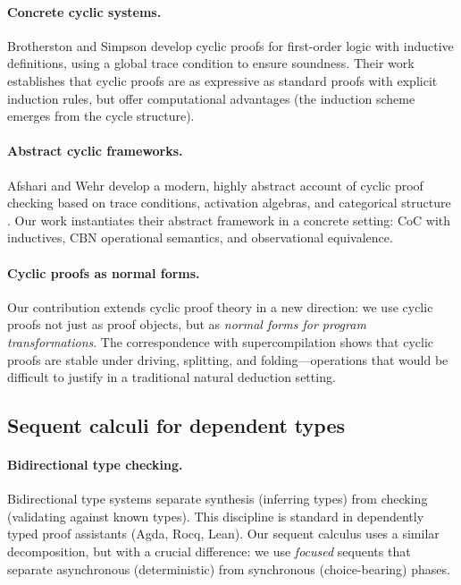 \paragraph{Concrete cyclic systems.}
Brotherston and Simpson develop cyclic proofs for first-order logic with inductive definitions, using a global trace condition to ensure soundness.
Their work establishes that cyclic proofs are as expressive as standard proofs with explicit induction rules, but offer computational advantages (the induction scheme emerges from the cycle structure).

\paragraph{Abstract cyclic frameworks.}
Afshari and Wehr develop a modern, highly abstract account of cyclic proof checking based on trace conditions, activation algebras, and categorical structure \cite{afshari-wehr-2024-abstract-cyclic}.
Our work instantiates their abstract framework in a concrete setting: CoC with inductives, CBN operational semantics, and observational equivalence.

\paragraph{Cyclic proofs as normal forms.}
Our contribution extends cyclic proof theory in a new direction: we use cyclic proofs not just as proof objects, but as \emph{normal forms for program transformations}.
The correspondence with supercompilation shows that cyclic proofs are stable under driving, splitting, and folding---operations that would be difficult to justify in a traditional natural deduction setting.

\subsection{Sequent calculi for dependent types}

\paragraph{Bidirectional type checking.}
Bidirectional type systems \cite{pierce-turner-2000-local-type-inference} separate synthesis (inferring types) from checking (validating against known types).
This discipline is standard in dependently typed proof assistants (Agda, Rocq, Lean).
Our sequent calculus uses a similar decomposition, but with a crucial difference: we use \emph{focused} sequents that separate asynchronous (deterministic) from synchronous (choice-bearing) phases.

